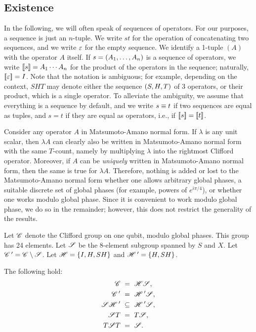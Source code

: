 \subsection{Existence} %
\label{sub:existence}
In the following, we will often speak of sequences of operators. For our purposes, a sequence is
just an $n$-tuple. We write $st$ for the operation of concatenating two sequences, and we write
$\varepsilon$ for the empty sequence. We identify a 1-tuple $(A)$ with the operator $A$ itself. If
$s=(A_1,\ldots,A_n)$ is a sequence of operators, we write $[\![s]\!]=A_1\cdots A_n$ for the
product of the operators in the sequence; naturally, $[\![\varepsilon]\!]=I$. Note that the notation is
ambiguous; for example, depending on the context, $SHT$ may denote either the sequence
$(S,H,T)$ of 3 operators, or their product, which is a single operator. To alleviate the
ambiguity, we assume that everything is a sequence by default, and we write $s\equiv t$ if two
sequences are equal as tuples, and $s=t$ if they are equal as operators, i.e., if $[\![s]\!]=[\![t]\!]$.

\begin{remark}
  Consider any operator $A$ in Matsumoto-Amano normal form. If $\lambda$ is any unit scalar, then
  $\lambda A$ can clearly also be written in Matsumoto-Amano normal form with the same $T$-count,
  namely by multiplying $\lambda$ into the rightmost Clifford operator. Moreover, if $A$ can be
  {\em uniquely} written in Matsumoto-Amano normal form, then the same is true for $\lambda A$.
  Therefore, nothing is added or lost to the Matsumoto-Amano normal form whether one allows
  arbitrary global phases, a suitable discrete set of global phases (for example, powers of
  $e^{i\pi/4}$), or whether one works modulo global phase. Since it is convenient to work modulo
  global phase, we do so in the remainder; however, this does not restrict the generality of the
  results.
\end{remark}

\begin{definition}
  Let $\mathscr{C}$ denote the Clifford group on one qubit, modulo global phases. This group has 24
  elements. Let $\mathscr{S}$ be the 8-element subgroup spanned by $S$ and $X$. Let $\mathscr{C}\,' = \mathscr{C}\setminus\mathscr{S}$. Let
  $\mathscr{H} = \{I,H,SH\}$ and $\mathscr{H}\,' = \{H,SH\}$.
\end{definition}

\begin{lemma}\label{lem-SH}
  The following hold:
  \begin{align}
    \mathscr{C} ~&=~ \mathscr{H}\mathscr{S},\label{eqn-CHS}\\
    \mathscr{C}\,' ~&=~ \mathscr{H}\,'\mathscr{S},\label{eqn-CSHS}\\
    \mathscr{S}\mathscr{H}\,' ~&\subseteq~ \mathscr{H}\,'\mathscr{S},\label{eqn-SHHS}\\
    \mathscr{S} T ~&=~ T \mathscr{S},\label{eqn-STTS}\\
    T \mathscr{S} T ~&=~ \mathscr{S}.\label{eqn-TSTS}
  \end{align}
\end{lemma}

